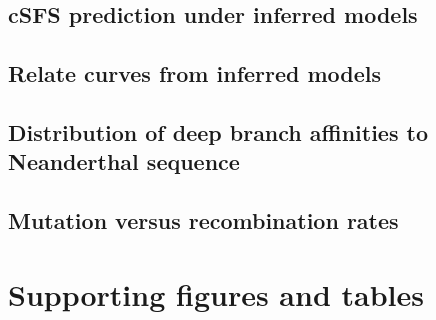 \documentclass[]{article}
\begin{document}
\subsection{cSFS prediction under inferred models}

\subsection{Relate curves from inferred models}

\subsection{Distribution of deep branch affinities to Neanderthal sequence}

\subsection{Mutation versus recombination rates}

\break




\break

\section*{Supporting figures and tables}
\end{document}
